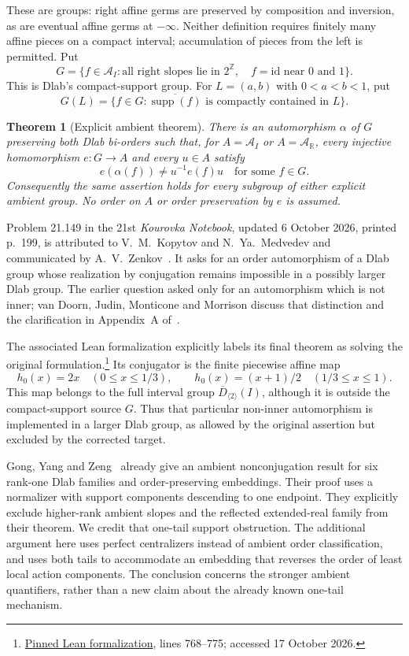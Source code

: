 \documentclass[10pt]{article}
\newtheorem{theorem}{Theorem}
\theoremstyle{definition}
\newcommand{\R}{\mathbb R}
\newcommand{\Z}{\mathbb Z}
\newcommand{\id}{\mathrm{id}}
\newcommand{\supp}{\operatorname{supp}}
\newcommand{\AI}{\mathcal A_I}
\newcommand{\AR}{\mathcal A_{\R}}
\begin{document}
These are groups: right affine germs are preserved by composition and
inversion, as are eventual affine germs at $-\infty$. Neither definition
requires finitely many affine pieces on a compact interval; accumulation
of pieces from the left is permitted. Put
\[
 G=\{f\in\AI:\text{all right slopes lie in }2^{\Z},\quad
 f=\id\text{ near }0\text{ and }1\}.
\]
This is Dlab's compact-support group. For $L=(a,b)$ with
$0<a<b<1$, put
\[
 G(L)=\{f\in G:\overline{\supp(f)}\text{ is compactly contained in }L\}.
\]

\begin{theorem}[Explicit ambient theorem]\label{thm:main}
There is an automorphism $\alpha$ of $G$ preserving both Dlab bi-orders
such that, for $A=\AI$ or $A=\AR$, every injective homomorphism
$e:G\longrightarrow A$ and every $u\in A$ satisfy
\[
 e(\alpha(f))\ne u^{-1}e(f)u\quad\text{for some }f\in G.
\]
Consequently the same assertion holds for every subgroup of either
explicit ambient group. No order on $A$ or order preservation by $e$ is
assumed.
\end{theorem}

Problem 21.149 in the 21st \emph{Kourovka Notebook}, updated
6 October 2026, printed p.~199, is attributed to V.~M.~Kopytov and
N.~Ya.~Medvedev and communicated by A.~V.~Zenkov~\cite{KN}.
It asks for an order automorphism of a Dlab group whose realization by
conjugation remains impossible in a possibly larger Dlab group. The
earlier question asked only for an automorphism which is not inner;
van Doorn, Judin, Monticone and Morrison discuss that distinction and
the clarification in Appendix~A of~\cite{VDJMM}.

The associated Lean formalization explicitly labels its final theorem as
solving the original formulation.\footnote{\href{https://github.com/pitmonticone/Kourovka/blob/64a4fe59b1df1893a0a1a68641d6806ccaaa7150/Kourovka/Problem_21_149.lean\#L768-L775}{Pinned Lean formalization},
lines 768--775; accessed 17 October 2026.}
Its conjugator is the finite piecewise affine map
\[
 h_0(x)=2x\quad(0\le x\le1/3),\qquad
 h_0(x)=(x+1)/2\quad(1/3\le x\le1).
\]
This map belongs to the full interval group $\overline D_{\langle2\rangle}(I)$,
although it is outside the compact-support source $G$. Thus that
particular non-inner automorphism is implemented in a larger Dlab group,
as allowed by the original assertion but excluded by the corrected target.

Gong, Yang and Zeng~\cite[Theorem~1.1]{GYZ} already give an ambient
nonconjugation result for six rank-one Dlab families and order-preserving
embeddings. Their proof uses a normalizer with support components
descending to one endpoint. They explicitly exclude higher-rank ambient
slopes and the reflected extended-real family from their theorem. We
credit that one-tail support obstruction. The additional argument here
uses perfect centralizers instead of ambient order classification, and
uses both tails to accommodate an embedding that reverses the order
of least local action components. The conclusion concerns the stronger ambient quantifiers, rather than
a new claim about the already known one-tail mechanism.
\end{document}
